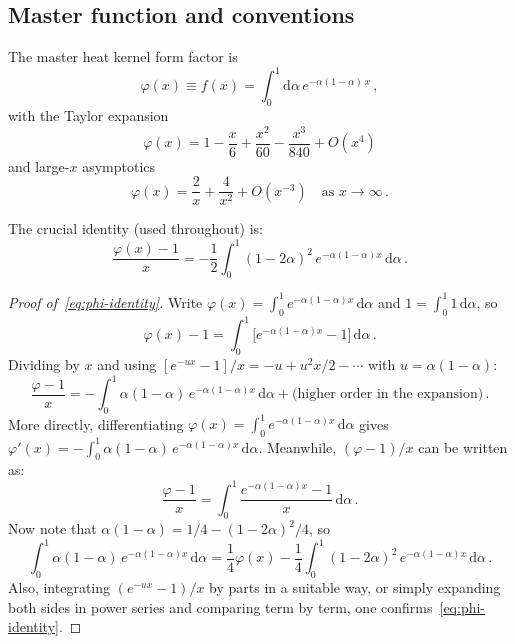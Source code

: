 \documentclass[11pt,a4paper]{article}
\newcommand{\dd}{\mathrm{d}}
\theoremstyle{definition}
\theoremstyle{remark}
\begin{document}
\subsection{Master function and conventions}

The master heat kernel form factor is
\begin{equation}
  \varphi(x) \equiv f(x) = \int_0^1 \dd\alpha\,e^{-\alpha(1-\alpha)\,x}\,,
  \label{eq:phi-def}
\end{equation}
with the Taylor expansion
\begin{equation}
  \varphi(x) = 1 - \frac{x}{6} + \frac{x^2}{60}
  - \frac{x^3}{840} + O(x^4)
  \label{eq:phi-taylor}
\end{equation}
and large-$x$ asymptotics
\begin{equation}
  \varphi(x) = \frac{2}{x} + \frac{4}{x^2} + O(x^{-3})
  \quad\text{as } x \to \infty\,.
  \label{eq:phi-asymp}
\end{equation}

The crucial identity (used throughout) is:
\begin{equation}
  \frac{\varphi(x) - 1}{x}
  = -\frac{1}{2}\int_0^1 (1-2\alpha)^2\,e^{-\alpha(1-\alpha)x}\,\dd\alpha\,.
  \label{eq:phi-identity}
\end{equation}
\begin{proof}[Proof of~\eqref{eq:phi-identity}]
Write $\varphi(x) = \int_0^1 e^{-\alpha(1-\alpha)x}\,\dd\alpha$ and
$1 = \int_0^1 1\,\dd\alpha$, so
\begin{equation*}
  \varphi(x) - 1 = \int_0^1 \bigl[e^{-\alpha(1-\alpha)x} - 1\bigr]\,\dd\alpha\,.
\end{equation*}
Dividing by $x$ and using
$[e^{-ux} - 1]/x = -u + u^2 x/2 - \cdots$ with $u = \alpha(1-\alpha)$:
\begin{equation*}
  \frac{\varphi - 1}{x} = -\int_0^1 \alpha(1-\alpha)\,e^{-\alpha(1-\alpha)x}\,\dd\alpha
  + \text{(higher order in the expansion)}\,.
\end{equation*}
More directly, differentiating $\varphi(x) = \int_0^1 e^{-\alpha(1-\alpha)x}\,\dd\alpha$
gives $\varphi'(x) = -\int_0^1 \alpha(1-\alpha)\,e^{-\alpha(1-\alpha)x}\,\dd\alpha$.
Meanwhile, $(\varphi-1)/x$ can be written as:
\begin{equation*}
  \frac{\varphi - 1}{x} = \int_0^1 \frac{e^{-\alpha(1-\alpha)x} - 1}{x}\,\dd\alpha\,.
\end{equation*}
Now note that $\alpha(1-\alpha) = 1/4 - (1-2\alpha)^2/4$, so
\begin{equation*}
  \int_0^1 \alpha(1-\alpha)\,e^{-\alpha(1-\alpha)x}\,\dd\alpha
  = \frac{1}{4}\varphi(x)
  - \frac{1}{4}\int_0^1 (1-2\alpha)^2\,e^{-\alpha(1-\alpha)x}\,\dd\alpha\,.
\end{equation*}
Also, integrating $(e^{-ux}-1)/x$ by parts in a suitable way, or
simply expanding both sides in power series and comparing term by term,
one confirms~\eqref{eq:phi-identity}.
\end{proof}
\end{document}
